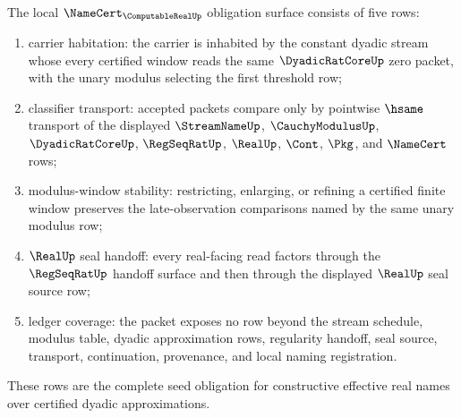 \begin{theorem}
\label{thm:computable-real-namecert-obligation-surface}
The local $\NameCert_{\ComputableRealUp}$ obligation surface consists of five
rows:
\begin{enumerate}
\item carrier habitation: the carrier is inhabited by the constant dyadic
stream whose every certified window reads the same $\DyadicRatCoreUp$ zero
packet, with the unary modulus selecting the first threshold row;
\item classifier transport: accepted packets compare only by pointwise
$\hsame$ transport of the displayed $\StreamNameUp$, $\CauchyModulusUp$,
$\DyadicRatCoreUp$, $\RegSeqRatUp$, $\RealUp$, $\Cont$, $\Pkg$, and
$\NameCert$ rows;
\item modulus-window stability: restricting, enlarging, or refining a
certified finite window preserves the late-observation comparisons named by
the same unary modulus row;
\item $\RealUp$ seal handoff: every real-facing read factors through the
$\RegSeqRatUp$ handoff surface and then through the displayed $\RealUp$ seal
source row;
\item ledger coverage: the packet exposes no row beyond the stream schedule,
modulus table, dyadic approximation rows, regularity handoff, seal source,
transport, continuation, provenance, and local naming registration.
\end{enumerate}
These rows are the complete seed obligation for constructive effective real
names over certified dyadic approximations.
\end{theorem}
